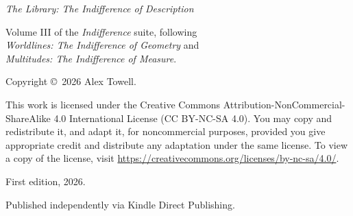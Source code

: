 \thispagestyle{empty}

\begin{center}
\textit{The Library: The Indifference of Description}

\medskip

Volume III of the \textit{Indifference} suite, following\\
\textit{Worldlines: The Indifference of Geometry} and\\
\textit{Multitudes: The Indifference of Measure}.

\medskip

Copyright \copyright\ 2026 Alex Towell.

\medskip

This work is licensed under the Creative Commons Attribution-NonCommercial-ShareAlike 4.0 International License (CC BY-NC-SA 4.0). You may copy and redistribute it, and adapt it, for noncommercial purposes, provided you give appropriate credit and distribute any adaptation under the same license. To view a copy of the license, visit \url{https://creativecommons.org/licenses/by-nc-sa/4.0/}.

\medskip

First edition, 2026.

\medskip

Published independently via Kindle Direct Publishing.

\end{center}

